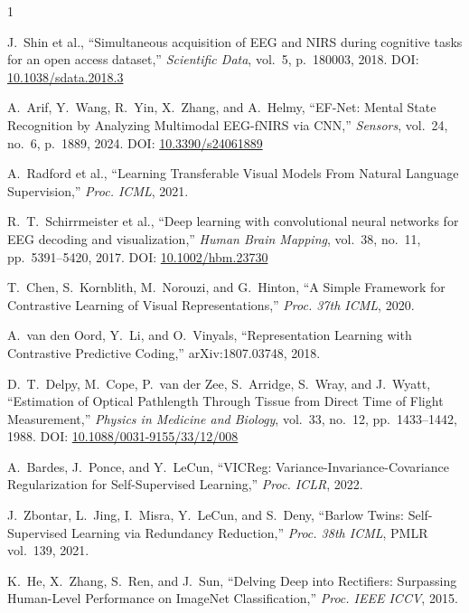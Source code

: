 \documentclass[journal]{IEEEtran}
\begin{document}
\begin{thebibliography}{1}

J.~Shin et al., ``Simultaneous acquisition of EEG and NIRS during cognitive tasks for an open access dataset,'' \textit{Scientific Data}, vol.~5, p.~180003, 2018. DOI: \href{https://doi.org/10.1038/sdata.2018.3}{10.1038/sdata.2018.3}

A.~Arif, Y.~Wang, R.~Yin, X.~Zhang, and A.~Helmy, ``EF-Net: Mental State Recognition by Analyzing Multimodal EEG-fNIRS via CNN,'' \textit{Sensors}, vol.~24, no.~6, p.~1889, 2024. DOI: \href{https://doi.org/10.3390/s24061889}{10.3390/s24061889}

A.~Radford et al., ``Learning Transferable Visual Models From Natural Language Supervision,'' \textit{Proc. ICML}, 2021.

R.~T.~Schirrmeister et al., ``Deep learning with convolutional neural networks for EEG decoding and visualization,'' \textit{Human Brain Mapping}, vol.~38, no.~11, pp.~5391--5420, 2017. DOI: \href{https://doi.org/10.1002/hbm.23730}{10.1002/hbm.23730}

T.~Chen, S.~Kornblith, M.~Norouzi, and G.~Hinton, ``A Simple Framework for Contrastive Learning of Visual Representations,'' \textit{Proc. 37th ICML}, 2020.

A.~van den Oord, Y.~Li, and O.~Vinyals, ``Representation Learning with Contrastive Predictive Coding,'' arXiv:1807.03748, 2018.

D.~T.~Delpy, M.~Cope, P.~van der Zee, S.~Arridge, S.~Wray, and J.~Wyatt, ``Estimation of Optical Pathlength Through Tissue from Direct Time of Flight Measurement,'' \textit{Physics in Medicine and Biology}, vol.~33, no.~12, pp.~1433--1442, 1988. DOI: \href{https://doi.org/10.1088/0031-9155/33/12/008}{10.1088/0031-9155/33/12/008}

A.~Bardes, J.~Ponce, and Y.~LeCun, ``VICReg: Variance-Invariance-Covariance Regularization for Self-Supervised Learning,'' \textit{Proc. ICLR}, 2022.

J.~Zbontar, L.~Jing, I.~Misra, Y.~LeCun, and S.~Deny, ``Barlow Twins: Self-Supervised Learning via Redundancy Reduction,'' \textit{Proc. 38th ICML}, PMLR vol.~139, 2021.

K.~He, X.~Zhang, S.~Ren, and J.~Sun, ``Delving Deep into Rectifiers: Surpassing Human-Level Performance on ImageNet Classification,'' \textit{Proc. IEEE ICCV}, 2015.


\end{thebibliography}
\end{document}
